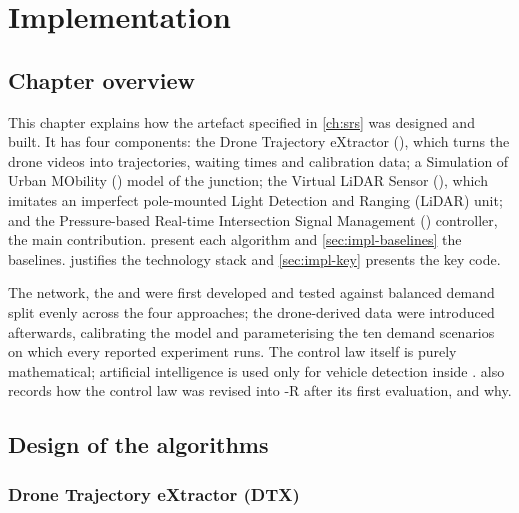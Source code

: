\chapter{Implementation}\label{ch:impl}

\section{Chapter overview}

This chapter explains how the artefact specified in \cref{ch:srs} was designed and built. It has four components: the Drone Trajectory eXtractor (\dtx{}), which turns the drone videos into trajectories, waiting times and calibration data; a Simulation of Urban MObility (\sumo{}) model of the junction; the Virtual LiDAR Sensor (\vls{}), which imitates an imperfect pole-mounted Light Detection and Ranging (LiDAR) unit; and the Pressure-based Real-time Intersection Signal Management (\prism{}) controller, the main contribution.
 present each algorithm and \cref{sec:impl-baselines} the baselines.  justifies the technology stack and \cref{sec:impl-key} presents the key code.

The \sumo{} network, the \vls{} and \prism{} were first developed and tested against balanced demand split evenly across the four approaches; the drone-derived data were introduced afterwards, calibrating the model and parameterising the ten demand scenarios on which every reported experiment runs. The control law itself is purely mathematical; artificial intelligence is used only for
vehicle detection inside \dtx{}.  also records how the control law was revised into \prism{}-R after its first evaluation, and why.

\section{Design of the algorithms}\label{sec:impl-design}

\subsection{Drone Trajectory eXtractor (DTX)}\label{sec:impl-dtx}

